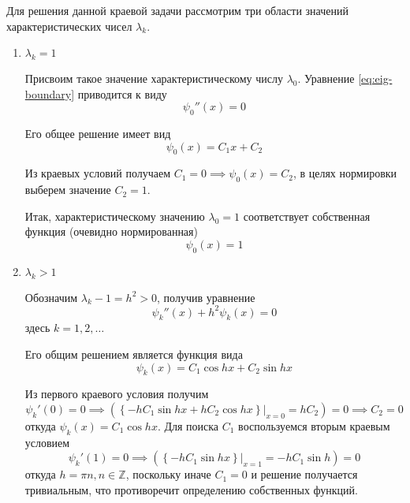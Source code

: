 \documentclass[11pt]{article}
\numberwithin{equation}{section}
\newcommand{\at}[2]{\left. {#1}\right\vert_{#2}}
\newcommand{\set}[1]{\mathbb{#1}}
\begin{document}
Для решения данной краевой задачи рассмотрим три области значений
характеристических чисел $\lambda_k$.
\begin{enumerate}
\item $\lambda_k=1$

  Присвоим такое значение характеристическому числу $\lambda_0$.
  Уравнение \eqref{eq:eig-boundary} приводится к виду
  \begin{equation*}
    \psi_0''(x)=0
  \end{equation*}

  Его общее решение имеет вид
  \begin{equation*}
    \psi_0(x) = C_1x+C_2
  \end{equation*}

  Из краевых условий получаем $C_1=0 \implies \psi_0(x) = C_2$, в целях
  нормировки выберем значение $C_2 = 1$.

  Итак, характеристическому значению $\lambda_0=1$ соответствует
  собственная функция (очевидно нормированная)
  \begin{equation*}
    \psi_0(x) = 1
  \end{equation*}

\item $\lambda_k > 1$
  
  Обозначим $\lambda_k-1 = h^2 > 0$, получив уравнение
  \begin{equation*}
    \psi_k''(x)+h^2\psi_k(x) = 0
  \end{equation*}
  здесь $k = 1, 2, \dotsc$

  Его общим решением является функция вида
  \begin{equation*}
    \psi_k(x) = C_1 \cos{hx} + C_2 \sin{hx}
  \end{equation*}

  Из первого краевого условия получим
  \begin{equation*}
    \psi_k'(0) = 0 \implies \left( \at{\left \{ -h C_1 \sin{hx} + h C_2 \cos{hx} \right \}}{x=0} =
      h C_2 \right) = 0 \implies C_2 = 0
  \end{equation*}
  откуда $\psi_k(x) = C_1 \cos{hx}$. Для поиска $C_1$ воспользуемся
  вторым краевым условием
  \begin{equation*}
    \psi_k'(1) = 0 \implies \left( \at{\left \{ -h C_1 \sin{hx} \right \}}{x=1} =
      - h C_1 \sin{h} \right) = 0
  \end{equation*}
  откуда $h = \pi n, n \in \set{Z}$, поскольку иначе $C_1 = 0$ и
  решение получается тривиальным, что противоречит определению
  собственных функций.


\end{enumerate}
\end{document}
